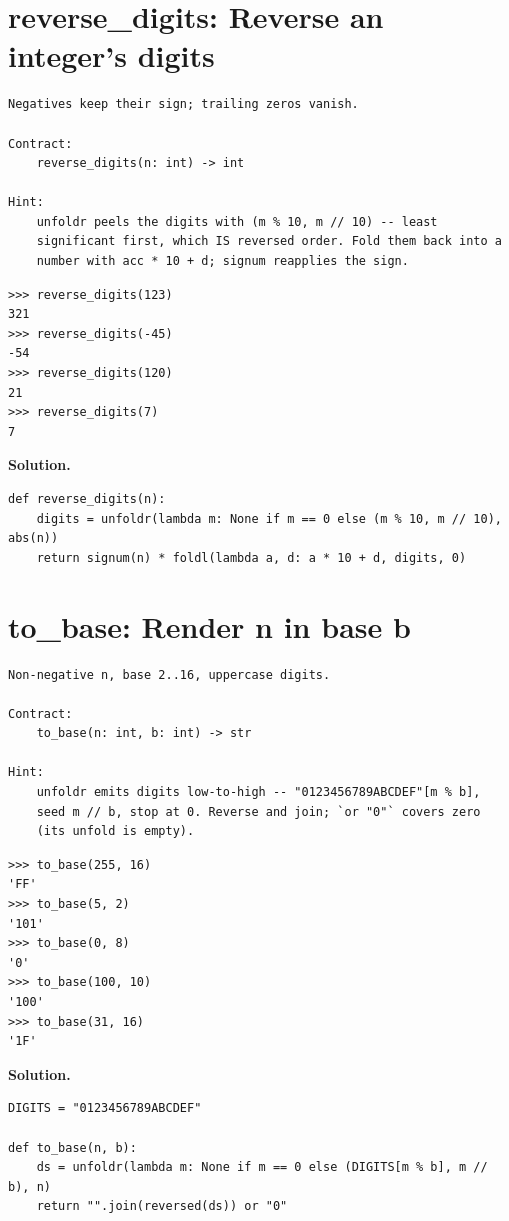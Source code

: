 \documentclass[10pt,letterpaper]{book}
\begin{document}
\section{reverse\_digits: Reverse an integer's digits}
\begin{lstlisting}[style=ex]
Negatives keep their sign; trailing zeros vanish.

Contract:
    reverse_digits(n: int) -> int

Hint:
    unfoldr peels the digits with (m % 10, m // 10) -- least
    significant first, which IS reversed order. Fold them back into a
    number with acc * 10 + d; signum reapplies the sign.
\end{lstlisting}
\begin{lstlisting}[style=ex]
>>> reverse_digits(123)
321
>>> reverse_digits(-45)
-54
>>> reverse_digits(120)
21
>>> reverse_digits(7)
7
\end{lstlisting}
\noindent\textbf{Solution.}
\begin{lstlisting}[style=code]
def reverse_digits(n):
    digits = unfoldr(lambda m: None if m == 0 else (m % 10, m // 10), abs(n))
    return signum(n) * foldl(lambda a, d: a * 10 + d, digits, 0)
\end{lstlisting}

\section{to\_base: Render n in base b}
\begin{lstlisting}[style=ex]
Non-negative n, base 2..16, uppercase digits.

Contract:
    to_base(n: int, b: int) -> str

Hint:
    unfoldr emits digits low-to-high -- "0123456789ABCDEF"[m % b],
    seed m // b, stop at 0. Reverse and join; `or "0"` covers zero
    (its unfold is empty).
\end{lstlisting}
\begin{lstlisting}[style=ex]
>>> to_base(255, 16)
'FF'
>>> to_base(5, 2)
'101'
>>> to_base(0, 8)
'0'
>>> to_base(100, 10)
'100'
>>> to_base(31, 16)
'1F'
\end{lstlisting}
\noindent\textbf{Solution.}
\begin{lstlisting}[style=code]
DIGITS = "0123456789ABCDEF"

def to_base(n, b):
    ds = unfoldr(lambda m: None if m == 0 else (DIGITS[m % b], m // b), n)
    return "".join(reversed(ds)) or "0"
\end{lstlisting}
\end{document}
